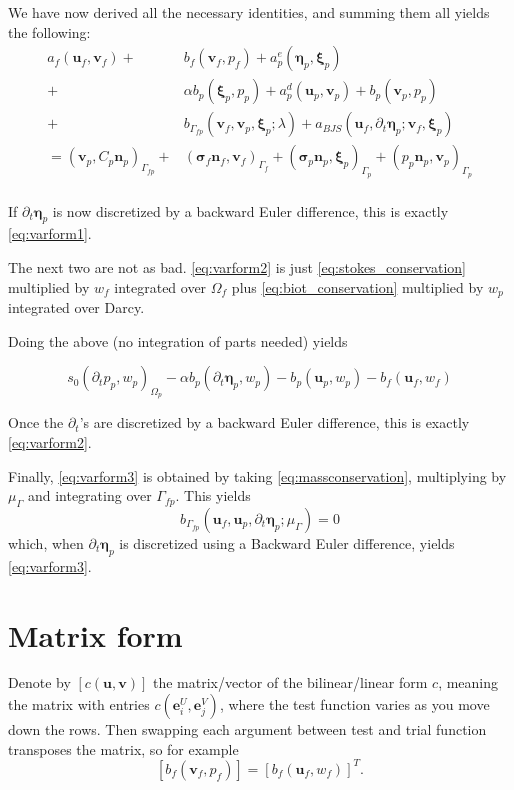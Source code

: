 \documentclass{article}
\newcommand{\mathspace}[1]{\ensuremath{#1}\xspace} %
\newcommand{\sigmabf}{\mathspace{\boldsymbol{\sigma}}}
\newcommand{\inner}[2]{\mathspace{\left (#1, #2 \right)}}
\newcommand{\ddt}[1]{\mathspace{\partial_t #1}}
\newcommand{\matrixform}[1]{\mathspace{\left [ #1 \right ]}}
\newcommand{\stokes}{\mathspace{\Omega_{f}}}
\newcommand{\stokesbdy}{\mathspace{\Gamma_{f}}}
\newcommand{\darcy}{\mathspace{\Omega_{p}}}
\newcommand{\darcybdy}{\mathspace{\Gamma_{p}}}
\newcommand{\interface}{\mathspace{\Gamma_{fp}}}
\newcommand{\nf}{\mathspace{\mathbf{n}_f}}
\newcommand{\np}{\mathspace{\mathbf{n}_p}}
\newcommand{\uf}{\mathspace{\mathbf{u}_f}}
\newcommand{\vf}{\mathspace{\mathbf{v}_f}}
\newcommand{\up}{\mathspace{\mathbf{u}_p}}
\newcommand{\vp}{\mathspace{\mathbf{v}_p}}
\newcommand{\pf}{\mathspace{p_f}}
\newcommand{\pp}{\mathspace{p_p}}
\newcommand{\wf}{\mathspace{w_f}}
\renewcommand{\wp}{\mathspace{w_p}}
\newcommand{\disp}{\mathspace{\boldsymbol{\eta}_p}}
\newcommand{\disptest}{\mathspace{\boldsymbol{\xi}_p}}
\newcommand{\multtest}{\mathspace{\mu_{\Gamma}}}
\begin{document}
We have now derived all the necessary identities, and summing them all yields the following:
\begin{align*}
  a_f(\uf, \vf) +& b_f(\vf, \pf)  + a^e_p(\disp, \disptest)  \\ +&\alpha b_p(\disptest, \pp)  + a_p^d(\up, \vp) + b_p(\vp, \pp)  \\
  + &b_{\interface}\left (\vf, \vp, \disptest; \lambda \right ) + a_{BJS}\left (\uf, \ddt{\disp}; \vf, \disptest \right)\\
      = \inner{\vp}{C_p\np}_{\interface} +& (\sigmabf_f\nf, \vf)_{\stokesbdy} + (\sigmabf_p\np, \disptest)_{\darcybdy} + (\pp\np, \vp)_{\darcybdy}\\
\end{align*}

If \ddt{\disp} is now discretized by a backward Euler difference, this is exactly \eqref{eq:varform1}.

The next two are not as bad. \eqref{eq:varform2} is just \eqref{eq:stokes_conservation} multiplied by \wf integrated over \stokes plus \eqref{eq:biot_conservation} multiplied by \wp integrated over Darcy.

Doing the above (no integration of parts needed) yields

$$s_0\inner{\ddt{\pp}}{\wp}_{\darcy} - \alpha b_p(\ddt{\disp}, \wp)
- b_p(\up, \wp) - b_f(\uf, \wf)$$ 

Once the \ddt{}'s are discretized by a backward Euler difference, this is exactly \eqref{eq:varform2}.

Finally, \eqref{eq:varform3} is obtained by taking \eqref{eq:massconservation}, multiplying by \multtest and integrating over \interface. This yields $$b_{\interface} (\uf, \up, \ddt{\disp} ;\multtest) = 0$$
which, when \ddt{\disp} is discretized using a Backward Euler difference, yields \eqref{eq:varform3}.



\section{Matrix form}
Denote by $\matrixform{c(\mathbf{u}, \mathbf{v})}$ the matrix/vector of the bilinear/linear form $c$, meaning the matrix with entries $c(\mathbf{e}^U_i, \mathbf{e}^V_j)$, where the test function varies as you move down the rows. Then swapping each argument between test and trial function transposes the matrix, so for example $$\matrixform{b_f(\vf, \pf)} = \matrixform{b_f(\uf, \wf)}^T. $$
 
\end{document}
